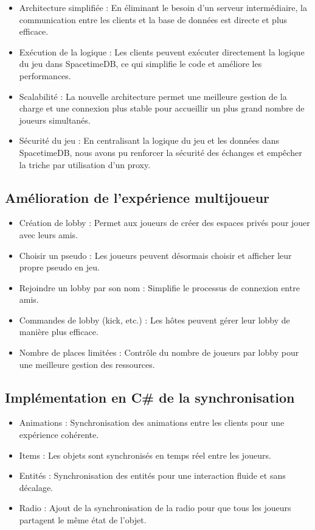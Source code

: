 \documentclass[
	article,			%
	11pt,				%
	oneside,			%
	a4paper,			%
	chapter=TITLE,
	french,			%
	sumario=tradicional
	]{base_nt}
\begin{document}
\begin{itemize}
    \item Architecture simplifiée : En éliminant le besoin d'un serveur intermédiaire, la communication entre les clients et la base de données est directe et plus efficace.
    \item Exécution de la logique : Les clients peuvent exécuter directement la logique du jeu dans SpacetimeDB, ce qui simplifie le code et améliore les performances.
    \item Scalabilité : La nouvelle architecture permet une meilleure gestion de la charge et une connexion plus stable pour accueillir un plus grand nombre de joueurs simultanés.
    \item Sécurité du jeu : En centralisant la logique du jeu et les données dans SpacetimeDB, nous avons pu renforcer la sécurité des échanges et empêcher la triche par utilisation d'un proxy.
\end{itemize}

\newpage

\subsection{Amélioration de l'expérience multijoueur}

\begin{itemize}
    \item Création de lobby : Permet aux joueurs de créer des espaces privés pour jouer avec leurs amis.
    \item Choisir un pseudo : Les joueurs peuvent désormais choisir et afficher leur propre pseudo en jeu.
    \item Rejoindre un lobby par son nom : Simplifie le processus de connexion entre amis.
    \item Commandes de lobby (kick, etc.) : Les hôtes peuvent gérer leur lobby de manière plus efficace.
    \item Nombre de places limitées : Contrôle du nombre de joueurs par lobby pour une meilleure gestion des ressources.
\end{itemize}

\subsection{Implémentation en C\# de la synchronisation}

\begin{itemize}
    \item Animations : Synchronisation des animations entre les clients pour une expérience cohérente.
    \item Items : Les objets sont synchronisés en temps réel entre les joueurs.
    \item Entités : Synchronisation des entités pour une interaction fluide et sans décalage.
    \item Radio : Ajout de la synchronisation de la radio pour que tous les joueurs partagent le même état de l'objet.
\end{itemize}
\end{document}
